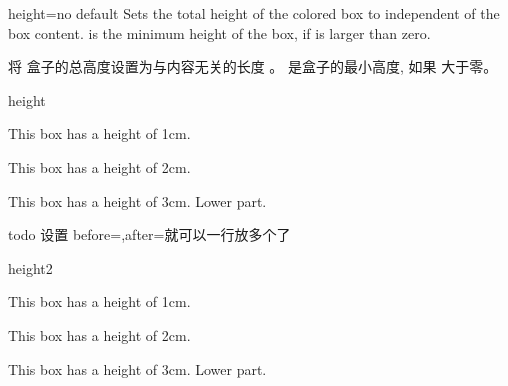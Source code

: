 \begin{docTcbKey}{height}{=}{no default}
Sets the total height of the colored box to  independent
of the box content.  is the minimum height of the box, if
 is larger than zero.

将%
盒子的总高度设置为与内容无关的长度  。  是盒子的最小高度, 如果
 大于零。
\begin{exdispExample}{height}

\begin{tcolorbox}[height=1cm,valign=center]
This box has a height of 1cm.
\end{tcolorbox}
\begin{tcolorbox}[height=2cm,valign=center]
This box has a height of 2cm.
\end{tcolorbox}
\begin{tcolorbox}[height=3cm,split=0.5,valign=center,valign lower=center]
This box has a height of 3cm.
\tcblower
Lower part.
\end{tcolorbox}
\end{exdispExample}

todo 设置  before=,after=\hfill 就可以一行放多个了
\begin{exdispExample}{height2}

\begin{tcolorbox}[height=1cm,valign=center]
This box has a height of 1cm.
\end{tcolorbox}
\begin{tcolorbox}[height=2cm,valign=center]
This box has a height of 2cm.
\end{tcolorbox}
\begin{tcolorbox}[height=3cm,split=0.5,valign=center,valign lower=center]
This box has a height of 3cm.
\tcblower
Lower part.
\end{tcolorbox}
\end{exdispExample}
\end{docTcbKey}



